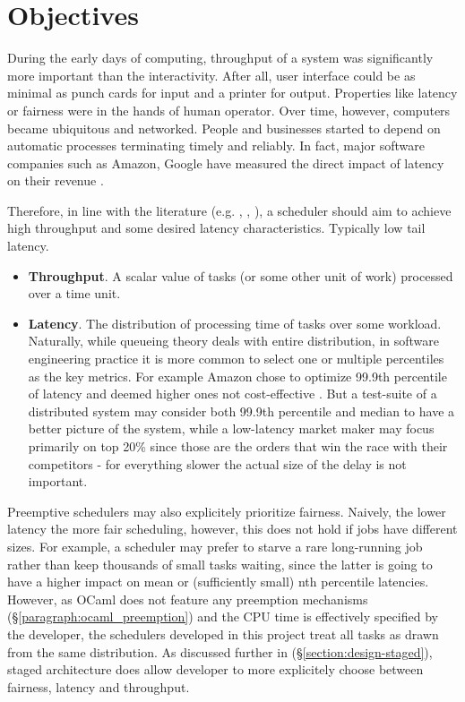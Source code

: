 \documentclass[12pt,a4paper,twoside]{report}
\begin{document}
\section{Objectives}
\label{section:objectives}
During the early days of computing, throughput of a system was significantly more important than the interactivity. After all, user interface could be as minimal as punch cards for input and a printer for output. Properties like latency or fairness were in the hands of human operator. Over time, however, computers became ubiquitous and networked. People and businesses started to depend on automatic processes terminating timely and reliably. In fact, major software companies such as Amazon, Google have measured the direct impact of latency on their revenue \cite{Kleppmann2017-en}.

Therefore, in line with the literature (e.g. \cite{8057206}, \cite{latthrough}, \cite{Sun2021}), a scheduler should aim to achieve high throughput and some desired latency characteristics. Typically low tail latency.
\begin{itemize}
    \item \textbf{Throughput}. A scalar value of tasks (or some other unit of work) processed over a time unit.
    \item \textbf{Latency}. The distribution of processing time of tasks over some workload. Naturally, while queueing theory deals with entire distribution, in software engineering practice it is more common to select one or multiple percentiles as the key metrics. For example Amazon chose to optimize 99.9th percentile of latency and deemed higher ones not cost-effective \cite{Kleppmann2017-en}. But a test-suite of a distributed system may consider both 99.9th percentile and median to have a better picture of the system, while a low-latency market maker may focus primarily on top 20\% since those are the orders that win the race with their competitors - for everything slower the actual size of the delay is not important. 
\end{itemize}

Preemptive schedulers may also explicitely prioritize fairness. Naively, the lower latency the more fair scheduling, however, this does not hold if jobs have different sizes. For example, a scheduler may prefer to starve a rare long-running job rather than keep thousands of small tasks waiting, since the latter is going to have a higher impact on mean or (sufficiently small) nth percentile latencies. However, as OCaml does not feature any preemption mechanisms (\S\ref{paragraph:ocaml_preemption}) and the CPU time is effectively specified by the developer, the schedulers developed in this project treat all tasks as drawn from the same distribution. As discussed further in (\S\ref{section:design-staged}), staged architecture does allow developer to more explicitely choose between fairness, latency and throughput. 
\end{document}
